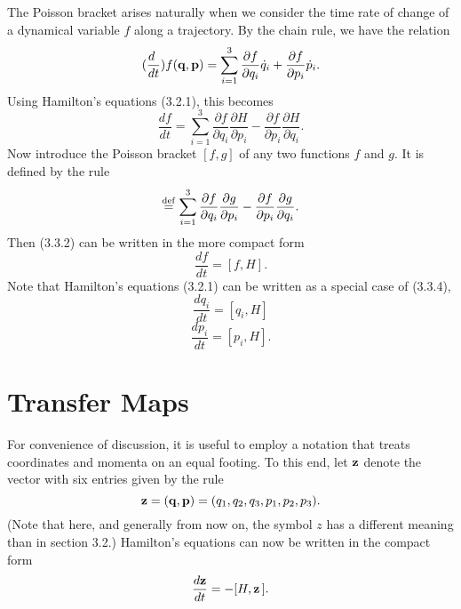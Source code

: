      The Poisson bracket arises naturally when we consider the time rate of
change of a dynamical variable $f$ along a trajectory.  By the chain rule, we
have the relation
\begin{equation}
       (\frac{d\ }{dt}) f({\bf q},{\bf p}) =  \sum_{i=1}^3  \frac{\partial f}{\partial q_i} \dot{q}_i  + \frac{\partial f}{\partial p_i} \dot{p}_i .
\end{equation}
Using Hamilton's equations (3.2.1), this becomes
\begin{equation}
             \frac{df}{dt} =  \sum_{i=1}^3 \frac{\partial f}{\partial q_i} \frac{\partial H}{\partial p_i} - \frac{\partial f}{\partial p_i} \frac{\partial H}{\partial q_{i}}.
\end{equation}
Now introduce the Poisson bracket $[f,g]$ of any two functions $f$ and $g$.  It
is defined by the rule
\begin{equation}
         [f,g]  \stackrel{\rm def}{=}  \sum_{i=1}^3 \frac{\partial f}{\partial q_i} \frac{\partial g}{\partial p_i} - \frac{\partial f}{\partial p_i} \frac{\partial g}{\partial q_i}.
\end{equation}
Then (3.3.2) can be written in the more compact form
\begin{equation}
                     \frac{df}{dt} = [f,H].
\end{equation}
Note that Hamilton's equations (3.2.1) can be written as a special case of
(3.3.4),
\begin{equation}
         \frac{dq_i}{dt}  = [q_i,H]
\end{equation}
\begin{equation}
         \frac{dp_i}{dt}  = [p_i,H].
\end{equation}

\section{Transfer Maps}
\label{transfer}
     For convenience of discussion, it is useful to employ a notation that
treats coordinates and momenta on an equal footing.  To this end, let
${\bf z}$
denote the vector with six entries given by the rule
\begin{equation}
     {\bf z} = ({\bf q},{\bf p}) = (q_1,q_2,q_3,p_1,p_2,p_3).
\end{equation}
(Note that here, and generally from now on, the symbol $z$ has a different
meaning than in section 3.2.)  Hamilton's equations can now be written in
the compact form
\begin{equation}
            \frac{d{\bf z}}{dt} = -[H,{\bf z}\,] .
\end{equation}

